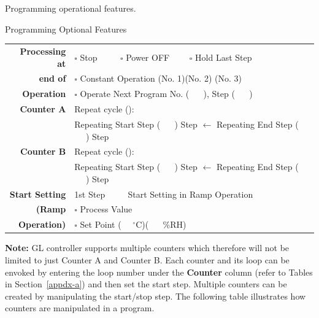 Programming operational features. 

\begin{table2}[label={mynamelabel},nameref={Title}]{Programming Optional Features} {\label{tab:sample-prog-05}}
   {%
     \begin{tabular}{r | l }
       \hline
       {\bf{Processing at}} & $\square$ Stop $\qquad$ $\square$ Power OFF  $\qquad \square$ Hold Last Step\\ 
       {\bf{end of}}   & $\square$ Constant Operation (No. 1)(No. 2) (No. 3) \\ 
       {\bf{Operation}} &  $\square$ Operate Next Program No. ( $\quad$ ), Step  ( $\quad$ ) \\ \hline 
       {\bf{Counter A}} & Repeat cycle (): \\
                        & Repeating Start Step ( $\quad$ ) Step $\longleftarrow$ Repeating End Step ( $\quad$ ) Step \\ \hline 
       {\bf{Counter B}} & Repeat cycle (): \\ 
                     & Repeating Start Step ( $\quad$ ) Step $\longleftarrow$ Repeating End Step ( $\quad$ ) Step \\ \hline 
      {\bf{Start Setting}}  & 1st Step $\qquad$ Start Setting in Ramp Operation \\
      {\bf{(Ramp}}  & $\square$ Process Value  \\  
      {\bf{Operation)}} & $\square$ Set Point ( $\quad {}^{\circ}$C)( $\quad$ \%RH) \\  
       \hline 
       \end{tabular}
   }
   \end{table2}

   {\bf{Note:}} GL controller supports multiple counters which therefore will not be limited to just Counter A and Counter B. Each counter and its loop can be envoked by entering the loop number under the {\bf{Counter}} column (refer to Tables in Section~\ref{appdx-a}) and then set the start step. Multiple counters can be created by manipulating the start/stop step. The following table illustrates how counters are manipulated in a program.   

